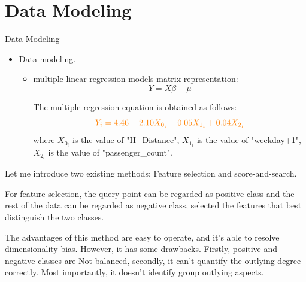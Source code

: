 \documentclass[
 size=14pt,
 paper=smartboard,  %
 mode=present, 		%
 display=slides, 	%
 style=tuliplab,  	%
 pauseslide,
 fleqn,leqno]{powerdot}
\begin{document}
\section{Data Modeling}
\begin{slide}{Data Modeling}
  \begin{itemize}
  \item
  Data modeling.
  
  \begin{itemize}
    \item
    multiple linear regression models matrix representation:$$
{Y} ={X}{\beta}+{\mu}$$

    The multiple regression equation is obtained as follows:$$
    \textcolor{orange}{{Y_i} =4.46+2.10{X_{0_i}}-0.05{X_{1_i}}+0.04{X_{2_i}}}
    $$where ${X_{0_i}}$ is the value of "H\_Distance", ${X_{1_i}}$ is the value of "weekday+1", ${X_{2_i}}$ is the value of "passenger\_count".
  \end{itemize}
  
  \end{itemize}
  
  
  
  \begin{note}
  Let me introduce two existing methods:
  Feature selection and score-and-search.
  
  For feature selection,
  the query point can be regarded as positive class and
  the rest of the data can be regarded as negative class,
  selected the features that best distinguish the two classes.
  
  The advantages of this method are easy to operate,
  and it's able to resolve dimensionality bias.
  However, it has some drawbacks.
  Firstly,
  positive and negative classes are Not balanced,
  secondly,
  it can't quantify the outlying degree correctly.
  Most importantly,
  it doesn't identify group outlying aspects.
  \end{note}
  
  \end{slide}
\end{document}
